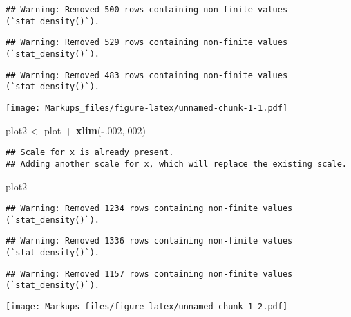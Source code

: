 \documentclass[
]{article}
\newenvironment{Shaded}{\begin{snugshade}}{\end{snugshade}}
\newcommand{\DecValTok}[1]{\textcolor[rgb]{0.00,0.00,0.81}{#1}}
\newcommand{\FunctionTok}[1]{\textcolor[rgb]{0.13,0.29,0.53}{\textbf{#1}}}
\newcommand{\NormalTok}[1]{#1}
\newcommand{\OtherTok}[1]{\textcolor[rgb]{0.56,0.35,0.01}{#1}}
\newcommand{\SpecialCharTok}[1]{\textcolor[rgb]{0.81,0.36,0.00}{\textbf{#1}}}
\begin{document}
\begin{verbatim}
## Warning: Removed 500 rows containing non-finite values (`stat_density()`).
\end{verbatim}

\begin{verbatim}
## Warning: Removed 529 rows containing non-finite values (`stat_density()`).
\end{verbatim}

\begin{verbatim}
## Warning: Removed 483 rows containing non-finite values (`stat_density()`).
\end{verbatim}

\texttt{[image: Markups\_files/figure-latex/unnamed-chunk-1-1.pdf]}

\begin{Shaded}
\begin{Highlighting}[]
\NormalTok{plot2 }\OtherTok{\textless{}{-}}\NormalTok{ plot }\SpecialCharTok{+} \FunctionTok{xlim}\NormalTok{(}\SpecialCharTok{{-}}\NormalTok{.}\DecValTok{002}\NormalTok{,.}\DecValTok{002}\NormalTok{)}
\end{Highlighting}
\end{Shaded}

\begin{verbatim}
## Scale for x is already present.
## Adding another scale for x, which will replace the existing scale.
\end{verbatim}

\begin{Shaded}
\begin{Highlighting}[]
\NormalTok{plot2}
\end{Highlighting}
\end{Shaded}

\begin{verbatim}
## Warning: Removed 1234 rows containing non-finite values (`stat_density()`).
\end{verbatim}

\begin{verbatim}
## Warning: Removed 1336 rows containing non-finite values (`stat_density()`).
\end{verbatim}

\begin{verbatim}
## Warning: Removed 1157 rows containing non-finite values (`stat_density()`).
\end{verbatim}

\texttt{[image: Markups\_files/figure-latex/unnamed-chunk-1-2.pdf]}
\end{document}
